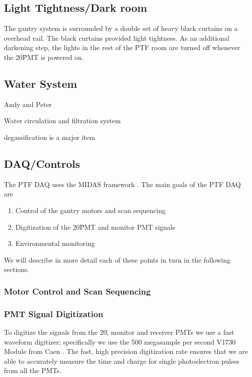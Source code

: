 \subsection{Light Tightness/Dark room}

The gantry system is surrounded by a double set of heavy black
curtains on a overhead rail.  The black curtains provided light tightness.
As an additional darkening step, the lights in the rest of the PTF room
are turned off whenever the 20\" PMT is powered on.


\subsection{Water System}
Andy and Peter

Water circulation and filtration system

degassification is a major item


\subsection{DAQ/Controls}
\label{Sec:DAQ_Controls}

The PTF DAQ uses the MIDAS framework \cite{MIDASRef}.  The main goals of the PTF DAQ are

\begin{enumerate}
\item Control of the gantry motors and scan sequencing
\item Digitization of the 20\" PMT and monitor PMT signals 
\item Environmental monitoring
\end{enumerate}

We will describe in more detail each of these points in turn in the following sections.

\subsubsection{Motor Control and Scan Sequencing}


\subsubsection{PMT Signal Digitization}

To digitize the signals from the 20\", monitor and receiver PMTs we use a fast waveform digitizer; specifically
we use the 500 megasample per second V1730 Module from Caen \cite{V1730Ref}.  The fast, high precision digitization rate ensures that we
are able to accurately measure the time and charge for single photoelectron pulses from all the PMTs.


